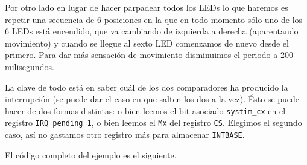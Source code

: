 Por otro lado en lugar de hacer parpadear todos los LEDs lo que haremos es repetir una
secuencia de 6 posiciones en la que en todo momento sólo uno de los 6 LEDs está encendido, que
va cambiando de izquierda a derecha (aparentando movimiento) y cuando se llegue al sexto LED
comenzamos de nuevo desde el primero. Para dar más sensación de movimiento disminuimos el periodo
a 200 milisegundos.

La clave de todo está en saber cuál de los dos comparadores ha producido la interrupción (se
puede dar el caso en que salten los dos a la vez). Ésto se puede hacer de dos formas distintas:
o bien leemos el bit asociado {\tt systim\_cx} en el registro {\tt IRQ pending 1}, o bien leemos
el {\tt Mx} del registro {\tt CS}. Elegimos el segundo caso, así no gastamos otro registro más
para almacenar {\tt INTBASE}.

El código completo del ejemplo es el siguiente.

